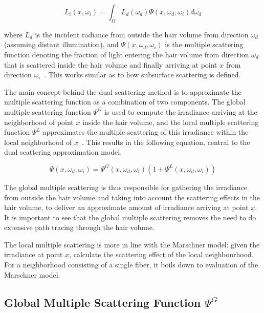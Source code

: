 \begin{equation}
L_i(x, \omega_i) = \int_{\Omega} L_d(\omega_d) \Psi(x, \omega_d, \omega_i) d\omega_d
\end{equation}

where $L_d$ is the incident radiance from outside the hair volume from direction $\omega_d$ (assuming distant illumination), and $\Psi(x, \omega_d, \omega_i)$ is the multiple scattering function denoting the fraction of light entering the hair volume from direction $\omega_d$ that is scattered inside the hair volume and finally arriving at point $x$ from direction $\omega_i$~\cite{zinke}. This works similar as to how subsurface scattering is defined.


%
%

The main concept behind the dual scattering method is to approximate the multiple scattering function as a combination of two components. The global multiple scattering function $\Psi^G$ is used to compute the irradiance arriving at the neighborhood of point $x$ inside the hair volume, and the local multiple scattering function $\Psi^L$ approximates the multiple scattering of this irradiance within the local neighborhood of $x$~\cite{zinke}.
This results in the following equation, central to the dual scattering approximation model.

\begin{equation}
\Psi(x, \omega_d, \omega_i) = \Psi^G(x, \omega_d, \omega_i) (1 + \Psi^L(x, \omega_d, \omega_i))
\end{equation}

The global multiple scattering is thus responsible for gathering the irradiance from outside the hair volume and taking into account the scattering effects in the hair volume, to deliver an approximate amount of irradiance arriving at point $x$. It is important to see that the global multiple scattering removes the need to do extensive path tracing through the hair volume.

The local multiple scattering is more in line with the Marschner model: given the irradiance at point $x$, calculate the scattering effect of the local neighbourhood. For a neighborhood consisting of a single fiber, it boils down to evaluation of the Marschner model.

\subsection{Global Multiple Scattering Function $\Psi^G$}

